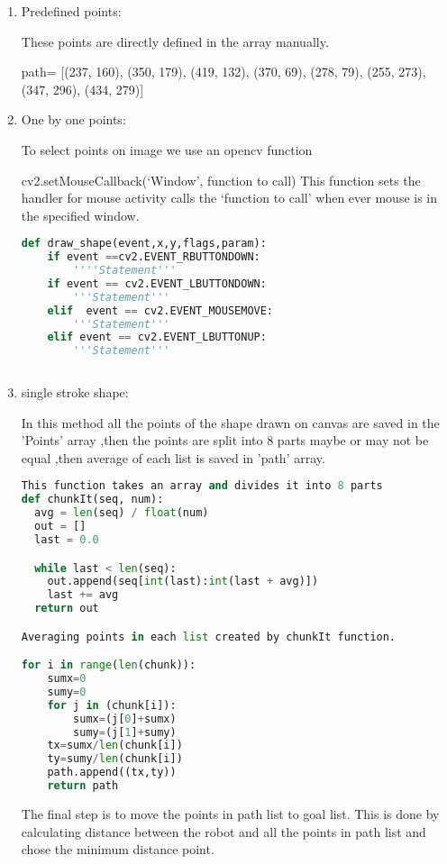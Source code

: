 \documentclass[main.tex]{subfiles}
\begin{document}
\begin{enumerate}
\item Predefined points:

These points are directly defined in the array manually.

path= [(237, 160), (350, 179), (419, 132), (370, 69), (278, 79), (255, 273), (347, 296), (434, 279)]

\item One by one points:

To select points on image we use an opencv function 

cv2.setMouseCallback(`Window', function to call)
This function sets the handler for mouse activity calls the `function to call' when ever mouse is in the specified window.
\begin{lstlisting}[language=Python, caption = Mouse activity call back function]
def draw_shape(event,x,y,flags,param):
    if event ==cv2.EVENT_RBUTTONDOWN:
    	''''Statement'''
    if event == cv2.EVENT_LBUTTONDOWN:
    	'''Statement'''
    elif  event == cv2.EVENT_MOUSEMOVE:
    	'''Statement'''            
    elif event == cv2.EVENT_LBUTTONUP:
    	'''Statement'''
        
\end{lstlisting}


\item single stroke shape:

In this method all the points of the shape drawn on canvas are saved in the 'Points' array ,then the points are split into 8 parts maybe or may not be equal ,then average of each list is saved in 'path' array.
\begin{lstlisting}[language=Python, caption = Point selection from a shape]
This function takes an array and divides it into 8 parts
def chunkIt(seq, num):
  avg = len(seq) / float(num)
  out = []
  last = 0.0

  while last < len(seq):
    out.append(seq[int(last):int(last + avg)])
    last += avg
  return out

Averaging points in each list created by chunkIt function.

for i in range(len(chunk)):
	sumx=0
    sumy=0
    for j in (chunk[i]):       
    	sumx=(j[0]+sumx)
        sumy=(j[1]+sumy)
    tx=sumx/len(chunk[i])
    ty=sumy/len(chunk[i])
    path.append((tx,ty))
    return path
\end{lstlisting}


The final step is to move the points in path list to goal list. This is done by calculating distance between the robot and all the points in path list and chose the minimum distance point.


\end{enumerate}
\end{document}
